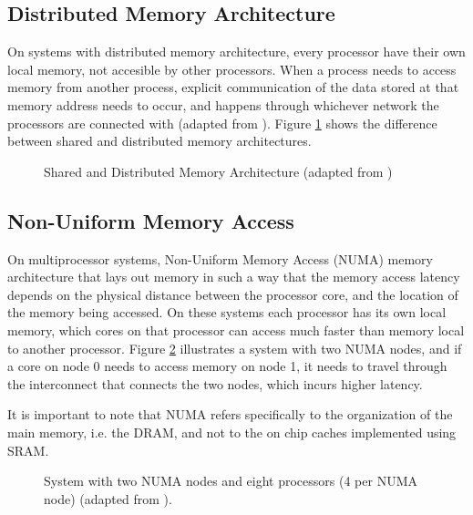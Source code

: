 \subsection{Distributed Memory Architecture}
On systems with distributed memory architecture, every processor have their own local memory, not accesible by other processors. When a process needs to access memory from another process, explicit communication of the data stored at that memory address needs to occur, and happens through whichever network the processors are connected with (adapted from \cite{manchanda2010non}). Figure \ref{fig:sharedmemory} shows the difference between shared and distributed memory architectures.
\medskip


\begin{figure}[ht]
    \centering
    \caption{Shared and Distributed Memory Architecture (adapted from \cite{llnlparallel})}
    \label{fig:sharedmemory}
\end{figure}

\subsection{Non-Uniform Memory Access}
On multiprocessor systems, Non-Uniform Memory Access (NUMA) memory architecture that lays out memory in such a way that the memory access latency depends on the physical distance between the processor core, and the location of the memory being accessed. On these systems each processor has its own local memory, which cores on that processor can access much faster than memory local to another processor. Figure \ref{fig:numanode} illustrates a system with two NUMA nodes, and if a core on node 0 needs to access memory on node 1, it needs to travel through the interconnect that connects the two nodes, which incurs higher latency.
\medskip

It is important to note that NUMA refers specifically to the organization of the main memory, i.e. the DRAM, and not to the on chip caches implemented using SRAM.

\begin{figure}[ht]
    \centering
    \caption{System with two NUMA nodes and eight processors (4 per NUMA node) (adapted from \cite{10.1145/2508834.2513149}).}
    \label{fig:numanode}
\end{figure}

